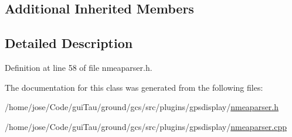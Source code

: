\subsection*{Additional Inherited Members}


\subsection{Detailed Description}


Definition at line 58 of file nmeaparser.\-h.



The documentation for this class was generated from the following files\-:\begin{DoxyCompactItemize}
\item 
/home/jose/\-Code/gui\-Tau/ground/gcs/src/plugins/gpsdisplay/\hyperlink{nmeaparser_8h}{nmeaparser.\-h}\item 
/home/jose/\-Code/gui\-Tau/ground/gcs/src/plugins/gpsdisplay/\hyperlink{nmeaparser_8cpp}{nmeaparser.\-cpp}\end{DoxyCompactItemize}
